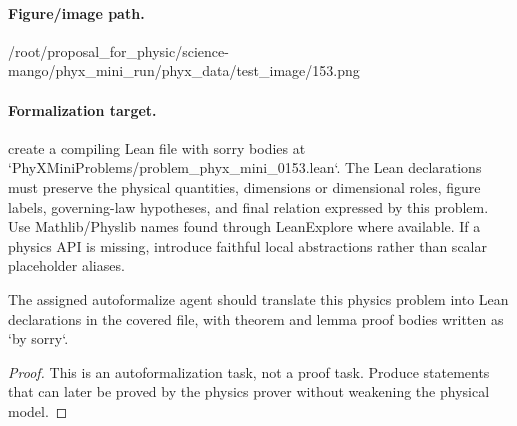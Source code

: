 \paragraph{Figure/image path.}
/root/proposal\_for\_physic/science-mango/phyx\_mini\_run/phyx\_data/test\_image/153.png

\paragraph{Formalization target.}
create a compiling Lean file with sorry bodies at `PhyXMiniProblems/problem\_phyx\_mini\_0153.lean`. The Lean declarations must preserve the physical quantities, dimensions or dimensional roles, figure labels, governing-law hypotheses, and final relation expressed by this problem.
Use Mathlib/Physlib names found through LeanExplore where available. If a physics API is missing, introduce faithful local abstractions rather than scalar placeholder aliases.

\begin{theorem}
\label{thm:physics:phyx_mini_0153:target}
The assigned autoformalize agent should translate this physics problem into Lean declarations in the covered file, with theorem and lemma proof bodies written as `by sorry`.
\end{theorem}
\begin{proof}
This is an autoformalization task, not a proof task. Produce statements that can later be proved by the physics prover without weakening the physical model.
\end{proof}

